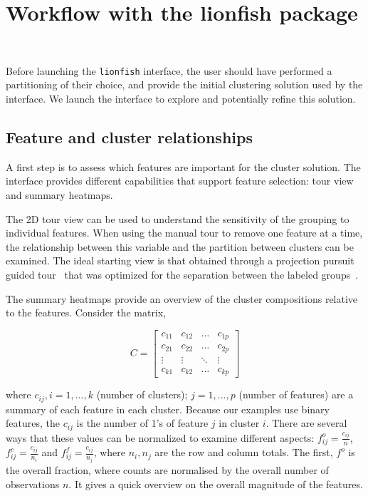 \documentclass[article]{ajs}
\begin{document}
\section{Workflow with the lionfish package}~\label{workflow}

Before launching the \texttt{lionfish} interface, the user should have performed a partitioning of their choice, and provide the initial clustering solution used by the interface. We launch the interface to explore and potentially refine this solution.

\subsection{Feature and cluster relationships}

A first step is to assess which features are important for the cluster solution. The interface provides different capabilities that support feature selection: tour view and summary heatmaps. 

The 2D tour view can be used to understand the sensitivity of the grouping to individual features. When using the manual tour to remove one feature at a time, the relationship between this variable and the partition between clusters can be examined. The ideal starting view is that obtained through a projection pursuit guided tour~\citep{CBCH94} that was optimized for the separation between the labeled groups~\citep{lckl2005}.

The summary heatmaps provide an overview of the cluster compositions relative to the features. Consider the matrix,

\[
C = \left[ \begin{array}{cccc} c_{11} & c_{12} & \dots & c_{1p} \\
                                              c_{21} & c_{22} & \dots & c_{2p} \\
                                              \vdots &  \vdots & \ddots &  \vdots \\
                                              c_{k1} & c_{k2} & \dots & c_{kp}
                                              \end{array} \right]
\]

where $c_{ij}, i=1, ..., k$ (number of clusters); $j=1, ..., p$ (number of features) are a summary of each feature in each cluster. Because our examples use binary features,  the $c_{ij}$ is the number of 1's of feature $j$ in cluster $i$. %
There are several ways that these values can be normalized to examine different aspects: $f_{ij}^{o} = \frac{c_{ij}}{n}$, $f_{ij}^{c} = \frac{c_{ij}}{n_{i}}$ and $f_{ij}^{f} = \frac{c_{ij}}{n_{j}}$, where $n_i, n_j$ are the row and column totals. The first, $f^{o}$ is the overall fraction, where counts are normalised by the overall number of observations $n$. It gives a quick overview on the overall magnitude of the features.
\end{document}
